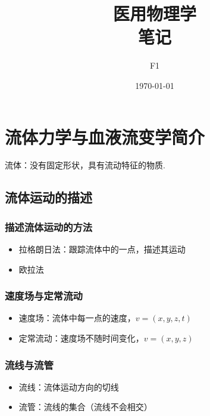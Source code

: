 \documentclass[12pt, a4paper, oneside]{ctexbook}
\title{{\Huge{\textbf{医用物理学}}}\\笔记}
\author{F1}
\date{\today}
\begin{document}
\maketitle

\setcounter{page}{1}



{}
\setcounter{page}{1}
\tableofcontents
\newpage
\setcounter{page}{1}

\chapter{流体力学与血液流变学简介}
流体：没有固定形状，具有流动特征的物质.

\section{流体运动的描述}
\subsection{描述流体运动的方法}
\begin{itemize}
    \item 拉格朗日法：跟踪流体中的一点，描述其运动
    \item 欧拉法
\end{itemize}   

\subsection{速度场与定常流动}
\begin{itemize}
    \item 速度场：流体中每一点的速度，$v = (x, y, z, t)$
    \item 定常流动：速度场不随时间变化，$v = (x, y, z)$
\end{itemize}

\subsection{流线与流管}
\begin{itemize}
    \item 流线：流体运动方向的切线
    \item 流管：流线的集合（流线不会相交）
\end{itemize}
\end{document}
